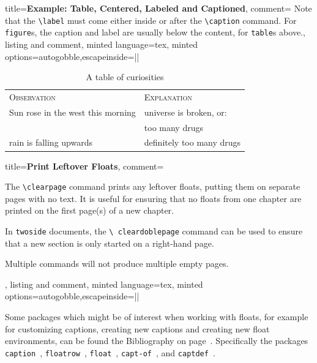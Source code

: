 \documentclass[article,a4paper,oneside,10pt]{memoir}
\newcommand\code[1]{\texttt{#1}}
\newcommand\pacname[1]{\texttt{#1}}
\begin{document}
\vfill
\begin{tcblisting}{%
        title={\bfseries\sffamily Example: Table, Centered, Labeled and Captioned},
        comment={%
            Note  that  the  \code{\textbackslash   label}  must  come  either
            inside  or after  the  \code{\textbackslash caption}  command. For
            \code{figure}s,  the  caption  and  label are  usually  below  the
            content, for \code{table}s above.},
        listing and comment,
        minted language=tex,
        minted options={autogobble,escapeinside=||}}
        \begin{table}
            \centering
            \caption{A table of curiosities}
            \label{tab:cur-table}
            \begin{tabular}{ll}
                \scshape Observation              & \scshape Explanation      \\
                Sun rose in the west this morning & universe is broken, or:   \\
                                                  & too many drugs            \\
                rain is falling upwards           & definitely too many drugs \\
            \end{tabular}
        \end{table}
\end{tcblisting}

\vfill
\begin{tcblisting}{%
        title={\bfseries\sffamily Print Leftover Floats},
        comment={%
            The  \code{\textbackslash clearpage}  command prints  any leftover
            floats, putting them on separate  pages with no text. It is useful
            for ensuring  that no floats from  one chapter are printed  on the
            first page(s) of a new chapter.
            
            In    \code{twoside}     documents,    the    \code{\textbackslash
            cleardoblepage} command can  be used to ensure that  a new section
            is only started on a right-hand page.

            Multiple commands will not produce multiple empty pages.},
        listing and comment,
        minted language=tex,
        minted options={autogobble,escapeinside=||}}
        \clearpage
        \cleardoublepage
\end{tcblisting}

\vfill
Some packages which might be of interest when working with floats, for example
for  customizing  captions,  creating  new captions  and  creating  new  float
environments, can  be found  the Bibliography  on page~\pageref{bibliography}.
Specifically the packages
\pacname{caption}~\cite{ctan:package:caption},
\pacname{floatrow}~\cite{ctan:package:floatrow},
\pacname{float}~\cite{ctan:package:float},
\pacname{capt-of}~\cite{ctan:package:capt-of},
and \pacname{captdef}~\cite{ctan:package:captdef}.
\end{document}
